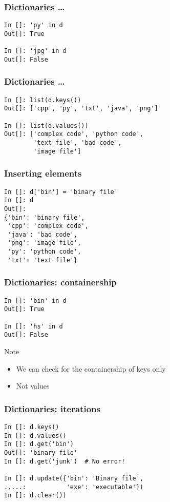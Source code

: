 \documentclass[14pt,compress]{beamer}
\begin{document}
\begin{frame}[fragile]
  \frametitle{Dictionaries \ldots}
  \begin{lstlisting}
In []: 'py' in d
Out[]: True

In []: 'jpg' in d
Out[]: False
  \end{lstlisting}
\end{frame}

\begin{frame}[fragile]
  \frametitle{Dictionaries \ldots}
  \begin{small}
    \begin{lstlisting}
In []: list(d.keys())
Out[]: ['cpp', 'py', 'txt', 'java', 'png']

In []: list(d.values())
Out[]: ['complex code', 'python code',
        'text file', 'bad code',
        'image file']
    \end{lstlisting}
  \end{small}
\end{frame}

\begin{frame}[fragile]
  \frametitle{Inserting elements}
  \begin{lstlisting}
In []: d['bin'] = 'binary file'
In []: d
Out[]:
{'bin': 'binary file',
 'cpp': 'complex code',
 'java': 'bad code',
 'png': 'image file',
 'py': 'python code',
 'txt': 'text file'}
  \end{lstlisting}
\end{frame}

\begin{frame}[fragile]
  \frametitle{Dictionaries: containership}
  \begin{lstlisting}
In []: 'bin' in d
Out[]: True

In []: 'hs' in d
Out[]: False
  \end{lstlisting}
  \begin{block}{Note}
    \begin{itemize}
      \item We can check for the containership of keys only
      \item Not values
    \end{itemize}
  \end{block}
\end{frame}

\begin{frame}[fragile]
  \frametitle{Dictionaries:  iterations}
\begin{lstlisting}
In []: d.keys()
In []: d.values()
In []: d.get('bin')
Out[]: 'binary file'
In []: d.get('junk')  # No error!

In []: d.update({'bin': 'Binary file',
.....:           'exe': 'executable'})
In []: d.clear())
\end{lstlisting}
\end{frame}
\end{document}

